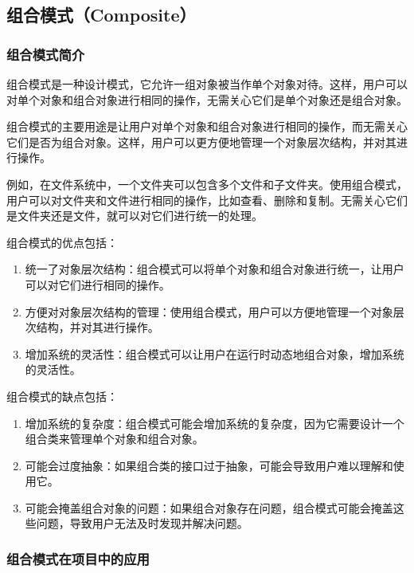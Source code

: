 \subsection{组合模式（Composite）}

\subsubsection{组合模式简介}
组合模式是一种设计模式，它允许一组对象被当作单个对象对待。这样，用户可以对单个对象和组合对象进行相同的操作，无需关心它们是单个对象还是组合对象。

组合模式的主要用途是让用户对单个对象和组合对象进行相同的操作，而无需关心它们是否为组合对象。这样，用户可以更方便地管理一个对象层次结构，并对其进行操作。

例如，在文件系统中，一个文件夹可以包含多个文件和子文件夹。使用组合模式，用户可以对文件夹和文件进行相同的操作，比如查看、删除和复制。无需关心它们是文件夹还是文件，就可以对它们进行统一的处理。

组合模式的优点包括：
\begin{enumerate}
    \item 统一了对象层次结构：组合模式可以将单个对象和组合对象进行统一，让用户可以对它们进行相同的操作。
    \item 方便对对象层次结构的管理：使用组合模式，用户可以方便地管理一个对象层次结构，并对其进行操作。
    \item 增加系统的灵活性：组合模式可以让用户在运行时动态地组合对象，增加系统的灵活性。
\end{enumerate}

组合模式的缺点包括：

\begin{enumerate}
    \item 增加系统的复杂度：组合模式可能会增加系统的复杂度，因为它需要设计一个组合类来管理单个对象和组合对象。
    \item 可能会过度抽象：如果组合类的接口过于抽象，可能会导致用户难以理解和使用它。
    \item 可能会掩盖组合对象的问题：如果组合对象存在问题，组合模式可能会掩盖这些问题，导致用户无法及时发现并解决问题。
\end{enumerate}

\subsubsection{组合模式在项目中的应用}

